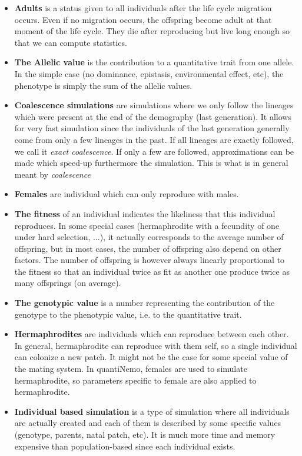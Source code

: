 \documentclass[letterpaper,12pt,oneside]{book}
\begin{document}
\begin{appendices}
\begin{itemize}
\item \textbf{Adults} is a status given to all individuals after the life cycle migration occurs. Even if no migration occurs, the offspring become adult at that moment of the life cycle. They die after reproducing but live long enough so that we can compute statistics. 
\item \textbf{The Allelic value} is the contribution to a quantitative trait from one allele. In the simple case (no dominance, epistasis, environmental effect, etc), the phenotype is simply the sum of the allelic values. 
\item \textbf{Coalescence simulations} are simulations where we only follow the lineages which were present at the end of the demography (last generation). It allows for very fast simulation since the individuals of the last generation generally come from only a few lineages in the past. If all lineages are exactly followed, we call it \textit{exact coalescence}. If only a few are followed, approximations can be made which speed-up furthermore the simulation. This is what is in general meant by \textit{coalescence}
\item \textbf{Females} are individual which can only reproduce with males. 
\item \textbf{The fitness} of an individual indicates the likeliness that this individual reproduces. In some special cases (hermaphrodite with a fecundity of one under hard selection, ...), it actually corresponds to the average number of offspring, but in most cases, the number of offspring also depend on other factors. The number of offspring is however always linearly proportional to the fitness so that an individual twice as fit as another one produce twice as many offsprings (on average).  
\item \textbf{The genotypic value} is a number representing the contribution of the genotype to the phenotypic value, i.e. to the quantitative trait. 
\item \textbf{Hermaphrodites} are individuals which can reproduce between each other. In general, hermaphrodite can reproduce with them self, so a single individual can colonize a new patch. It might not be the case for some special value of the mating system. In quantiNemo, females are used to simulate hermaphrodite, so parameters specific to female are also applied to hermaphrodite. 
\item \textbf{Individual based simulation} is a type of simulation where all individuals are actually created and each of them is described by some specific values (genotype, parents, natal patch, etc). It is much more time and memory expensive than population-based since each individual exists. 

\end{itemize}
\end{appendices}
\end{document}
